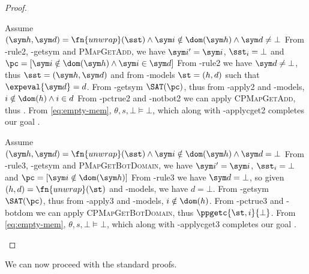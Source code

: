 \begin{proof}
\begin{hypvlist}
 Assume $(\sym h,\sym d)=\fn{unwrap}(\sst) \land \sym i\notin\dom(\sym h) \land \sym d\neq\bot$
 From \hyp{rule2}, \hyp{getsym} and \textsc{PMapGetAdd}, we have $\sym i'=\sym i$, $\sst_i=\bot$ and ${\pc=[\sym i\notin \dom(\sym h)\land \sym i \in \sym d]}$%
 From \hyp{rule2} we have $\sym d\neq\bot$, thus $\sst=(\sym h,\sym d)$ and from \hyp{models} $\st=(h,d)$ such that $\expeval{\sym d} = d$.
 From \hyp{getsym} $\SAT(\pc)$, thus from \hyp{apply2} and \hyp{models}, $i\notin \dom(h) \land i\in d$
 From \hyp{pctrue2} and \hyp{notbot2} we can apply \textsc{CPMapGetAdd}, thus .
 From \ref{eq:empty-mem}, $\theta,s,\bot\models\bot$, which along with \hyp{applycget2} completes our goal .
\end{hypvlist}


\begin{hypvlist}
 Assume $(\sym h,\sym d)=\fn{unwrap}(\sst) \land \sym i\notin \dom(\sym h) \land \sym d=\bot$
 From \hyp{rule3}, \hyp{getsym} and \textsc{PMapGetBotDomain}, we have $\sym i'=\sym i$, $\sst_i=\bot$ and ${\pc=[\sym i\notin \dom(\sym h)]}$
 From \hyp{rule3} we have $\sym d=\bot$, so given $(h,d)=\fn{unwrap}(\st)$ and \hyp{models}, we have $d=\bot$.%
 From \hyp{getsym} $\SAT(\pc)$, thus from \hyp{apply3} and \hyp{models}, $i\notin \dom(h)$.
 From \hyp{pctrue3} and \hyp{botdom} we can apply \textsc{CPMapGetBotDomain}, thus ${\ppgetc{\st,i}{\bot}}$.%
 From \ref{eq:empty-mem}, $\theta,s,\bot\models\bot$, which along with \hyp{applycget3} completes our goal .
\end{hypvlist}
\end{proof}

We can now proceed with the standard proofs.

